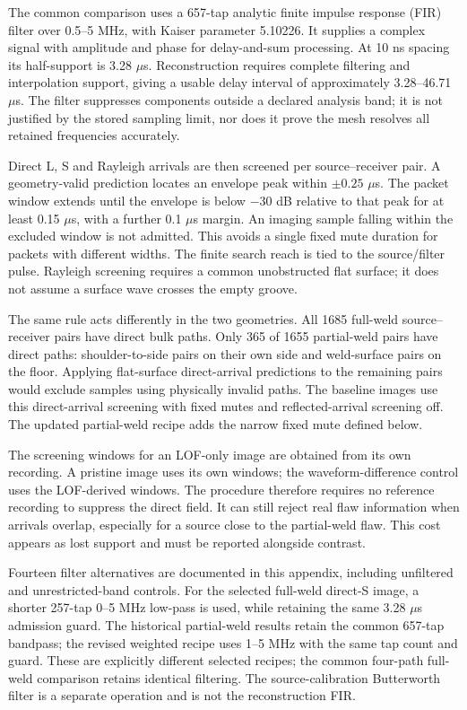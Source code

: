 The common comparison uses a 657-tap analytic finite impulse response (FIR) filter over 0.5--5 MHz, with Kaiser parameter 5.10226. It supplies a complex signal with amplitude and phase for delay-and-sum processing. At 10 ns spacing its half-support is 3.28 $\mu$s. Reconstruction requires complete filtering and interpolation support, giving a usable delay interval of approximately 3.28--46.71 $\mu$s. The filter suppresses components outside a declared analysis band; it is not justified by the stored sampling limit, nor does it prove the mesh resolves all retained frequencies accurately.

Direct L, S and Rayleigh arrivals are then screened per source--receiver pair. A geometry-valid prediction locates an envelope peak within $\pm0.25$ $\mu$s. The packet window extends until the envelope is below $-30$ dB relative to that peak for at least 0.15 $\mu$s, with a further 0.1 $\mu$s margin. An imaging sample falling within the excluded window is not admitted. This avoids a single fixed mute duration for packets with different widths. The finite search reach is tied to the source/filter pulse. Rayleigh screening requires a common unobstructed flat surface; it does not assume a surface wave crosses the empty groove.

The same rule acts differently in the two geometries. All 1685 full-weld source--receiver pairs have direct bulk paths. Only 365 of 1655 partial-weld pairs have direct paths: shoulder-to-side pairs on their own side and weld-surface pairs on the floor. Applying flat-surface direct-arrival predictions to the remaining pairs would exclude samples using physically invalid paths. The baseline images use this direct-arrival screening with fixed mutes and reflected-arrival screening off. The updated partial-weld recipe adds the narrow fixed mute defined below.

The screening windows for an LOF-only image are obtained from its own recording. A pristine image uses its own windows; the waveform-difference control uses the LOF-derived windows. The procedure therefore requires no reference recording to suppress the direct field. It can still reject real flaw information when arrivals overlap, especially for a source close to the partial-weld flaw. This cost appears as lost support and must be reported alongside contrast.

Fourteen filter alternatives are documented in this appendix, including unfiltered and unrestricted-band controls. For the selected full-weld direct-S image, a shorter 257-tap 0--5 MHz low-pass is used, while retaining the same 3.28 $\mu$s admission guard. The historical partial-weld results retain the common 657-tap bandpass; the revised weighted recipe uses 1--5 MHz with the same tap count and guard. These are explicitly different selected recipes; the common four-path full-weld comparison retains identical filtering. The source-calibration Butterworth filter is a separate operation and is not the reconstruction FIR.

